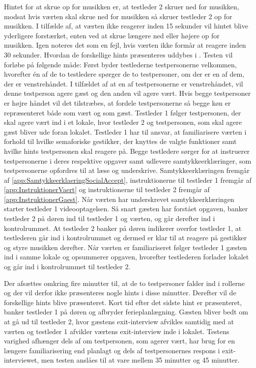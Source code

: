 Hintet for at skrue op for musikken er, at testleder 2 skruer ned for musikken, modsat hvis værten skal skrue ned for musikken så skruer testleder 2 op for musikken. I tilfælde af, at værten ikke reagerer inden 15 sekunder vil hintet blive yderligere forstærket, enten ved at skrue længere ned eller højere op for musikken. Igen noteres det som en fejl, hvis værten ikke formår at reagere inden 30 sekunder. Hvordan de forskellige hints præsenteres uddybes i .\blankline
% 
Testen vil forløbe på følgende måde: Først byder testlederne testpersonerne velkommen, hvorefter én af de to testledere spørger de to testpersoner, om der er en af dem, der er venstrehåndet. I tilfældet af at en af testpersonerne er venstrehåndet, vil denne testperson agere gæst og den anden vil agere vært. Hvis begge testpersoner er højre håndet vil det tilstræbes, at fordele testpersonerne så begge køn er repræsenteret både som vært og som gæst. Testleder 1 følger testpersonen, der skal agere vært ind i et lokale, hvor testleder 2 og testpersonen, som skal agere gæst bliver ude foran lokalet. Testleder 1 har til ansvar, at familiarisere værten i forhold til hvilke semaforiske gestikker, der knyttes de valgte funktioner samt hvilke hints testpersonen skal reagere på. Begge testledere sørger for at instruerer testpersonerne i deres respektive opgaver samt udlevere samtykkeerklæringer, som testpersonerne opfordres til at læse og underskrive. Samtykkeerklæringen fremgår af \autoref{app:SamtykkeerklaeringSocialAccept}, instruktionerne til testleder 1 fremgår af \autoref{app:InstruktionerVaert} og instruktionerne til testleder 2 fremgår af \autoref{app:InstruktionerGaest}. Når værten har underskrevet samtykkeerklæringen starter testleder 1 videooptagelsen. Så snart gæsten har forstået opgaven, banker testleder 2 på døren ind til testleder 1 og værten, og går derefter ind i kontrolrummet. At testleder 2 banker på døren indikerer overfor testleder 1, at testlederen går ind i kontrolrummet og dermed er klar til at reagere på gestikker og styre musikken derefter. Når værten er familiariseret følger testleder 1 gæsten ind i samme lokale og opsummerer opgaven, hvorefter testlederen forlader lokalet og går ind i kontrolrummet til testleder 2.
 
Der afsættes omkring fire minutter til, at de to testpersoner falder ind i rollerne og der vil derfor ikke præsenteres nogle hints i disse minutter. Derefter vil de forskellige hints blive præsenteret. Kort tid efter det sidste hint er præsenteret, banker testleder 1 på døren og afbryder ferieplanlægning. Gæsten bliver bedt om at gå ud til testleder 2, hvor gæstens exit-interview afvikles samtidig med at værten og testleder 1 afvikler værtens exit-interview inde i lokalet.\blankline
%
Testens varighed afhænger dels af om testpersonen, som agerer vært, har brug for en længere familiarisering end planlagt og dels af testpersonernes respons i exit-interviewet, men testen anslåes til at vare mellem 35 minutter og 45 minutter. 
%
